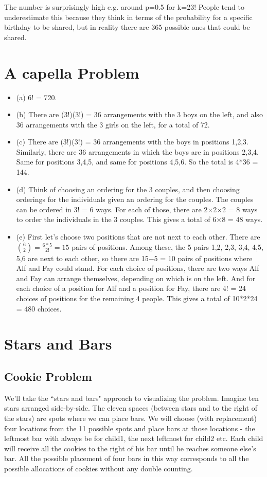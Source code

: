 The number is surprisingly high e.g. around p=0.5 for k=23!  People tend to underestimate this because they think in terms of the probability for a specific birthday to be shared, but in reality there are 365 possible ones that could be shared. 



\section{A capella Problem}
\begin{itemize}
\item (a) 6! = 720.
\item (b) There are (3!)(3!) = 36 arrangements with the 3 boys on the left, and also 36 arrangements with the 3 girls on the left, for a total of 72.
\item (c) There are (3!)(3!) = 36 arrangements with the boys in positions 1,2,3. Similarly, there are 36 arrangements in which the boys are in positions 2,3,4. Same for positions 3,4,5, and same for positions 4,5,6. So the total is 4*36 = 144.
\item (d) Think of choosing an ordering for the 3 couples, and then choosing orderings for the individuals given an ordering for the couples. The couples can be ordered in 3! = 6 ways. For each of those, there are 2×2×2 = 8 ways to order the individuals in the 3 couples. This gives a total of 6×8 = 48 ways.
\item (e) First let’s choose two positions that are not next to each other. There are ${6 \choose 2}=\frac{6*5}{2!} = 15$ pairs of
positions. Among these, the 5 pairs {1,2}, {2,3}, {3,4}, {4,5}, {5,6} are next to each other, so there are 15−5 = 10 pairs of positions where Alf and Fay could stand. For each choice of positions, there are two ways Alf and Fay can arrange themselves, depending on which is on the left. And for each choice of a position for Alf and a position for Fay, there are 4! = 24 choices of positions for the remaining 4 people. This gives a total of 10*2*24 = 480 choices.
\end{itemize}



\section{Stars and Bars}

\subsection{Cookie Problem}
We'll take the ``stars and bars" approach to visualizing the problem. Imagine ten stars arranged side-by-side. The eleven spaces (between stars and to the right of the stars) are spots where we can place bars. We will choose (with replacement) four locations from the 11 possible spots and place bars at those locations - the leftmost bar with always be for child1, the next leftmost for child2 etc. Each child will receive all the cookies to the right of his bar until he reaches someone else's bar. All the possible placement of four bars in this way corresponds to all the possible allocations of cookies without any double counting.\nn

